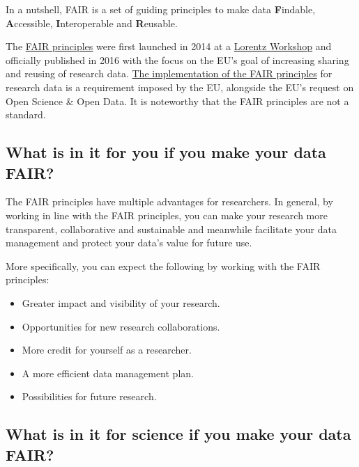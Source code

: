 \documentclass[
]{book}
\begin{document}
In a nutshell, FAIR is a set of guiding principles to make data \textbf{F}indable, \textbf{A}ccessible, \textbf{I}nteroperable and \textbf{R}eusable.

The \href{https://www.go-fair.org/fair-principles/}{FAIR principles} were first launched in 2014 at a \href{https://www.lorentzcenter.nl/}{Lorentz Workshop} and officially published in 2016 with the focus on the EU's goal of increasing sharing and reusing of research data. \href{https://eur-lex.europa.eu/legal-content/EN/TXT/?uri=uriserv:OJ.L_.2019.172.01.0056.01.ENG}{The implementation of the FAIR principles} for research data is a requirement imposed by the EU, alongside the EU's request on Open Science \& Open Data. It is noteworthy that the FAIR principles are not a standard.

\hypertarget{what-is-in-it-for-you-if-you-make-your-data-fair}{%
\subsection*{What is in it for you if you make your data FAIR?}\label{what-is-in-it-for-you-if-you-make-your-data-fair}}

The FAIR principles have multiple advantages for researchers. In general, by working in line with the FAIR principles, you can make your research more transparent, collaborative and sustainable and meanwhile facilitate your data management and protect your data's value for future use.

More specifically, you can expect the following by working with the FAIR principles:

\begin{itemize}
\item
  Greater impact and visibility of your research.
\item
  Opportunities for new research collaborations.
\item
  More credit for yourself as a researcher.
\item
  A more efficient data management plan.
\item
  Possibilities for future research.
\end{itemize}

\hypertarget{what-is-in-it-for-science-if-you-make-your-data-fair}{%
\subsection*{What is in it for science if you make your data FAIR?}\label{what-is-in-it-for-science-if-you-make-your-data-fair}}
\end{document}
